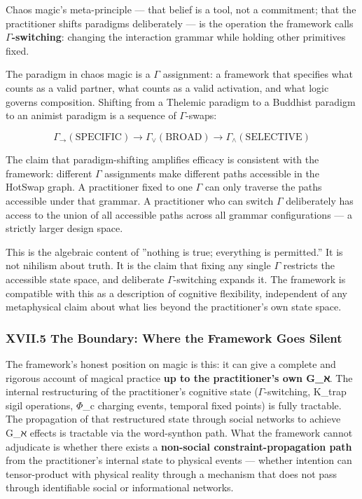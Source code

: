 \documentclass[12pt,a4paper]{article}
\begin{document}
Chaos magic's meta-principle --- that belief is a tool, not a commitment; that the practitioner shifts paradigms deliberately --- is the operation the framework calls \textbf{$\Gamma$-switching}: changing the interaction grammar while holding other primitives fixed.

The paradigm in chaos magic is a $\Gamma$ assignment: a framework that specifies what counts as a valid partner, what counts as a valid activation, and what logic governs composition. Shifting from a Thelemic paradigm to a Buddhist paradigm to an animist paradigm is a sequence of $\Gamma$-swaps:

\[\Gamma_\to(\text{SPECIFIC}) \to \Gamma_\vee(\text{BROAD}) \to \Gamma_\wedge(\text{SELECTIVE})\]

The claim that paradigm-shifting amplifies efficacy is consistent with the framework: different $\Gamma$ assignments make different paths accessible in the HotSwap graph. A practitioner fixed to one $\Gamma$ can only traverse the paths accessible under that grammar. A practitioner who can switch $\Gamma$ deliberately has access to the union of all accessible paths across all grammar configurations --- a strictly larger design space.

This is the algebraic content of ''nothing is true; everything is permitted.'' It is not nihilism about truth. It is the claim that fixing any single $\Gamma$ restricts the accessible state space, and deliberate $\Gamma$-switching expands it. The framework is compatible with this as a description of cognitive flexibility, independent of any metaphysical claim about what lies beyond the practitioner's own state space.

\subsubsection{XVII.5 The Boundary: Where the Framework Goes Silent}

The framework's honest position on magic is this: it can give a complete and rigorous account of magical practice \textbf{up to the practitioner's own G\_ℵ}. The internal restructuring of the practitioner's cognitive state ($\Gamma$-switching, K\_trap sigil operations, $\Phi$\_c charging events, temporal fixed points) is fully tractable. The propagation of that restructured state through social networks to achieve G\_ℵ effects is tractable via the word-synthon path. What the framework cannot adjudicate is whether there exists a \textbf{non-social constraint-propagation path} from the practitioner's internal state to physical events --- whether intention can tensor-product with physical reality through a mechanism that does not pass through identifiable social or informational networks.
\end{document}
